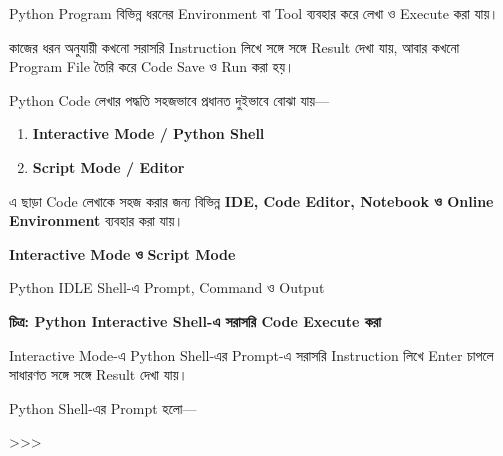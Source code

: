 
Python Program বিভিন্ন ধরনের Environment বা Tool ব্যবহার করে
লেখা ও Execute করা যায়।

কাজের ধরন অনুযায়ী কখনো সরাসরি Instruction লিখে সঙ্গে সঙ্গে
Result দেখা যায়, আবার কখনো Program File তৈরি করে Code
Save ও Run করা হয়।



Python Code লেখার পদ্ধতি সহজভাবে প্রধানত দুইভাবে বোঝা যায়—

\begin{enumerate}

\item \textbf{Interactive Mode / Python Shell}

\item \textbf{Script Mode / Editor}

\end{enumerate}

এ ছাড়া Code লেখাকে সহজ করার জন্য বিভিন্ন
\textbf{IDE, Code Editor, Notebook ও Online Environment}
ব্যবহার করা যায়।

\begin{center}

\textbf{Interactive Mode}
\qquad
\textbf{ও}
\qquad
\textbf{Script Mode}

\end{center}


{Python IDLE Shell-এ Prompt, Command ও Output}

\begin{center}
\footnotesize\textbf{চিত্র: Python Interactive Shell-এ সরাসরি Code Execute করা}
\end{center}


Interactive Mode-এ Python Shell-এর Prompt-এ সরাসরি
Instruction লিখে Enter চাপলে সাধারণত সঙ্গে সঙ্গে Result দেখা যায়।

Python Shell-এর Prompt হলো—

\begin{codebox}

\begin{english}
\ttfamily
>>>
\end{english}

\end{codebox}

